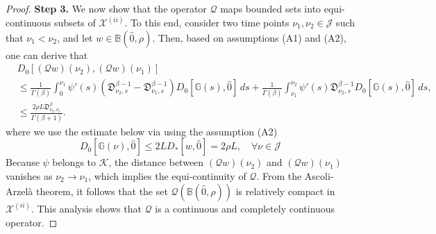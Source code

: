 \documentclass[reqno]{amsart}
\begin{document}
\begin{proof}
\noindent\textbf{Step 3.} 
We now show that the operator $\mathcal{Q}$ maps bounded sets into equi-continuous 
subsets of $\mathcal{X}^{(ii)}$. To this end, consider two time points 
$\nu _1, \nu _2 \in \mathcal{J}$ such that $\nu _1 < \nu _2$, and let 
$ w \in \mathbb{B}(\hat{0}, \rho)$. Then, based on assumptions (A1) and 
(A2), one can derive that
\begin{align*}
&D_0[(\mathcal{Q} w)(\nu _{2}),(\mathcal{Q} w)(\nu _{1})] \\
&\leq \frac{1}{\Gamma(\beta)} \int_0^{\nu _{1}} \psi'(s)
 (\mathfrak{D}_{\nu _{2},s}^{\beta-1}-\mathfrak{D}_{\nu _{1},s}^{\beta-1}) 
 D_0[\mathbb{G}(s), \hat{0}]\,ds
 +\frac{1}{\Gamma(\beta)} \int_{\nu _{1}}^{\nu _{2}} \psi'(s)
 \mathfrak{D}_{\nu _{2},s}^{\beta-1} D_0[\mathbb{G}(s), \hat{0}]\,ds, \\
& \leq \frac{2 \rho L\mathfrak{D}_{\nu _{2},\nu _{1}}^{\beta}}{\Gamma(\beta+1)}.
\end{align*}
where we use the estimate below via using the assumption (A2)
\begin{equation}\label{eq33}
D_0[\mathbb{G}(\nu ), \hat{0}] \leq 2 L D_{*}[ w, \hat{0}]
=2 \rho L, \quad \forall \nu \in\mathcal{J} 
\end{equation}
Because $\psi$ belongs to $\mathcal{K}$, the distance between 
$(\mathcal{Q} w)(\nu _2)$ and $(\mathcal{Q} w)(\nu _1)$ vanishes as
$\nu _2 \to \nu _1$, which implies the equi-continuity of $\mathcal{Q}$. 
From the Ascoli-Arzelà theorem, it follows that the set 
$\mathcal{Q}(\mathbb{B}(\hat{0}, \rho))$ is relatively compact in 
$\mathcal{X}^{(ii)}$. This analysis shows that $\mathcal{Q}$ is a continuous and 
completely continuous operator.
\smallskip


\end{proof}
\end{document}
